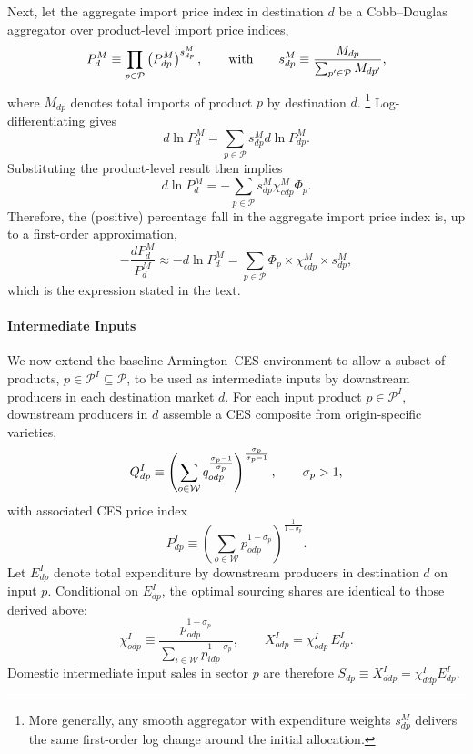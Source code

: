 \documentclass[english,12pt]{article}
\theoremstyle{definition}
\begin{document}
Next, let the aggregate import price index in destination $d$ be a
Cobb--Douglas aggregator over product-level import price indices, 
\begin{equation*}
P_{d}^{M}\equiv \prod_{p\in \mathcal{P}}\left( P_{dp}^{M}\right)
^{s_{dp}^{M}},\qquad \text{with}\qquad s_{dp}^{M}\equiv \frac{M_{dp}}{%
\sum_{p^{\prime }\in \mathcal{P}}M_{dp^{\prime }}},
\end{equation*}%
where $M_{dp}$ denotes total imports of product $p$ by destination $d$.%
\footnote{%
More generally, any smooth aggregator with expenditure weights $s_{dp}^{M}$
delivers the same first-order log change around the initial allocation.}
Log-differentiating gives 
\begin{equation*}
d\ln P_{d}^{M}=\sum_{p\in \mathcal{P}}s_{dp}^{M}d\ln P_{dp}^{M}.
\end{equation*}%
Substituting the product-level result then implies 
\begin{equation*}
d\ln P_{d}^{M}=-\sum_{p\in \mathcal{P}}s_{dp}^{M}\chi _{cdp}^{M}\Phi _{p}.
\end{equation*}%
Therefore, the (positive) percentage fall in the aggregate import price
index is, up to a first-order approximation, 
\begin{equation*}
-\frac{dP_{d}^{M}}{P_{d}^{M}}\approx -d\ln P_{d}^{M}=\sum_{p\in \mathcal{P}%
}\Phi _{p}\times \chi _{cdp}^{M}\times s_{dp}^{M},
\end{equation*}%
which is the expression stated in the text.

\paragraph{Intermediate Inputs}

We now extend the baseline Armington--CES environment to allow a subset of
products, $p\in \mathcal{P}^{I}\subseteq \mathcal{P}$, to be used as
intermediate inputs by downstream producers in each destination market $d$.
For each input product $p\in \mathcal{P}^{I}$, downstream producers in $d$
assemble a CES composite from origin-specific varieties, 
\begin{equation*}
Q_{dp}^{I}\equiv \left( \sum_{o\in \mathcal{W}}q_{odp}^{\frac{\sigma _{p}-1}{%
\sigma _{p}}}\right) ^{\frac{\sigma _{p}}{\sigma _{p}-1}},\qquad \sigma
_{p}>1,
\end{equation*}%
with associated CES price index 
\begin{equation*}
P_{dp}^{I}\equiv \left( \sum_{o\in \mathcal{W}}p_{odp}^{1-\sigma
_{p}}\right) ^{\frac{1}{1-\sigma _{p}}}.
\end{equation*}%
Let $E_{dp}^{I}$ denote total expenditure by downstream producers in
destination $d$ on input $p$. Conditional on $E_{dp}^{I}$, the optimal
sourcing shares are identical to those derived above: 
\begin{equation*}
\chi _{odp}^{I}\equiv \frac{p_{odp}^{1-\sigma _{p}}}{\sum_{i\in \mathcal{W}%
}p_{idp}^{1-\sigma _{p}}},\qquad X_{odp}^{I}=\chi _{odp}^{I}\,E_{dp}^{I}.
\end{equation*}%
Domestic intermediate input sales in sector $p$ are therefore $S_{dp}\equiv
X_{ddp}^{I}=\chi _{ddp}^{I}E_{dp}^{I}$.
\end{document}
